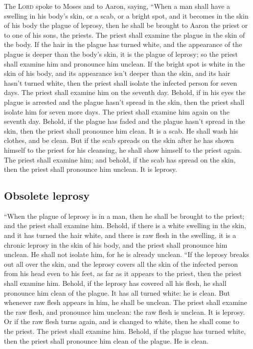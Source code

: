  The \textsc{Lord} spoke to Moses and to Aaron, saying,
 ``When a man shall have a swelling in his body's skin, or
a scab, or a bright spot, and it becomes in the skin of his body the
plague of leprosy, then he shall be brought to Aaron the priest or to
one of his sons, the priests.  The priest shall examine
the plague in the skin of the body. If the hair in the plague has turned
white, and the appearance of the plague is deeper than the body's skin,
it is the plague of leprosy; so the priest shall examine him and
pronounce him unclean.  If the bright spot is white in the
skin of his body, and its appearance isn't deeper than the skin, and its
hair hasn't turned white, then the priest shall isolate the infected
person for seven days.  The priest shall examine him on
the seventh day. Behold, if in his eyes the plague is arrested and the
plague hasn't spread in the skin, then the priest shall isolate him for
seven more days.  The priest shall examine him again on
the seventh day. Behold, if the plague has faded and the plague hasn't
spread in the skin, then the priest shall pronounce him clean. It is a
scab. He shall wash his clothes, and be clean.  But if the
scab spreads on the skin after he has shown himself to the priest for
his cleansing, he shall show himself to the priest again. 
The priest shall examine him; and behold, if the scab has spread on the
skin, then the priest shall pronounce him unclean. It is leprosy.

\hypertarget{obsolete-leprosy}{%
\subsection{Obsolete leprosy}\label{obsolete-leprosy}}

 ``When the plague of leprosy is in a man, then he shall
be brought to the priest;  and the priest shall examine
him. Behold, if there is a white swelling in the skin, and it has turned
the hair white, and there is raw flesh in the swelling, 
it is a chronic leprosy in the skin of his body, and the priest shall
pronounce him unclean. He shall not isolate him, for he is already
unclean.  ``If the leprosy breaks out all over the skin,
and the leprosy covers all the skin of the infected person from his head
even to his feet, as far as it appears to the priest, 
then the priest shall examine him. Behold, if the leprosy has covered
all his flesh, he shall pronounce him clean of the plague. It has all
turned white: he is clean.  But whenever raw flesh
appears in him, he shall be unclean.  The priest shall
examine the raw flesh, and pronounce him unclean: the raw flesh is
unclean. It is leprosy.  Or if the raw flesh turns again,
and is changed to white, then he shall come to the priest.
 The priest shall examine him. Behold, if the plague has
turned white, then the priest shall pronounce him clean of the plague.
He is clean.

